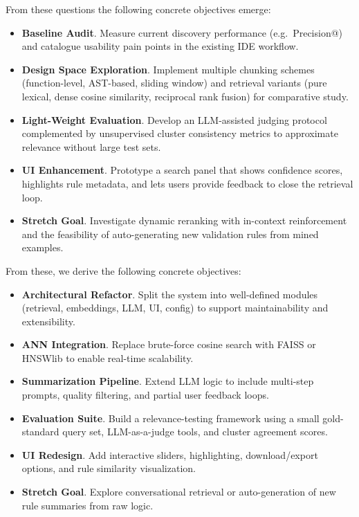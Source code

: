 From these questions the following concrete objectives emerge:

\begin{itemize}
    \item \textbf{Baseline Audit}. Measure current discovery performance (e.g.\ Precision@) and catalogue usability pain points in the existing IDE workflow.
    \item \textbf{Design Space Exploration}. Implement multiple chunking schemes (function-level, AST-based, sliding window) and retrieval variants (pure lexical, dense cosine similarity, reciprocal rank fusion) for comparative study.
    \item \textbf{Light-Weight Evaluation}. Develop an LLM-assisted judging protocol complemented by unsupervised cluster consistency metrics to approximate relevance without large test sets.
    \item \textbf{UI Enhancement}. Prototype a search panel that shows confidence scores, highlights rule metadata, and lets users provide feedback to close the retrieval loop.
    \item \textbf{Stretch Goal}. Investigate dynamic reranking with in-context reinforcement and the feasibility of auto-generating new validation rules from mined examples.
\end{itemize}

From these, we derive the following concrete objectives:

\begin{itemize}
    \item \textbf{Architectural Refactor}. Split the system into well-defined modules (retrieval, embeddings, LLM, UI, config) to support maintainability and extensibility.
    \item \textbf{ANN Integration}. Replace brute-force cosine search with FAISS or HNSWlib to enable real-time scalability.
    \item \textbf{Summarization Pipeline}. Extend LLM logic to include multi-step prompts, quality filtering, and partial user feedback loops.
    \item \textbf{Evaluation Suite}. Build a relevance-testing framework using a small gold-standard query set, LLM-as-a-judge tools, and cluster agreement scores.
    \item \textbf{UI Redesign}. Add interactive sliders, highlighting, download/export options, and rule similarity visualization.
    \item \textbf{Stretch Goal}. Explore conversational retrieval or auto-generation of new rule summaries from raw logic.
\end{itemize}

